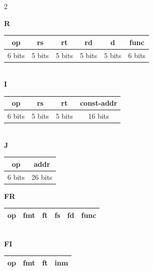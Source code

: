 \documentclass[11pt, a4paper]{article}
\begin{document}
\begin{multicols*}{2}
        \begin{tcolorbox}[
        colback=white, %
        colframe=blue!40!black, %
        title= {\centering \textbf{Formatos Básico de Instrucciones} },
        fonttitle=\bfseries,
        size=small
        ]
            \textbf{R}
            \begin{tabular}{|c|c|c|c|c|c|}
                \hline
                op & rs & rt & rd & d & func \\
                \hline
                \multicolumn{1}{c}{\tiny 6 bits} &
                \multicolumn{1}{c}{\tiny 5 bits} &
                \multicolumn{1}{c}{\tiny 5 bits} &
                \multicolumn{1}{c}{\tiny 5 bits} &
                \multicolumn{1}{c}{\tiny 5 bits} &
                \multicolumn{1}{c}{\tiny 6 bits} \\
            \end{tabular} \\
            \textbf{I}
            \begin{tabular}{|c|c|c|c|}
                \hline
                op & rs & rt & const-addr \\
                \hline
                 \multicolumn{1}{c}{\tiny 6 bits} &
                \multicolumn{1}{c}{\tiny 5 bits} &
                \multicolumn{1}{c}{\tiny 5 bits} &
                \multicolumn{1}{c}{\tiny 16 bits} \\
            \end{tabular} \\
            \textbf{J}
            \begin{tabular}{|c|c|}
                \hline
                op & addr  \\
                \hline
                \multicolumn{1}{c}{\tiny 6 bits} &
                \multicolumn{1}{c}{\tiny 26 bits} \\
            \end{tabular}
        \end{tcolorbox}

        \begin{tcolorbox}[
        colback=white, %
        colframe=blue!40!black, %
        title= {\centering \textbf{Formatos de Instrucción Punto Flotante} },
        fonttitle=\bfseries,
        size=small
        ]
            \textbf{FR}
            \begin{tabular}{|c|c|c|c|c|c|}
                \hline
                op & fmt & ft & fs & fd & func \\
                \hline
            \end{tabular} \\
            \textbf{FI}
            \begin{tabular}{|c|c|c|c|}
                \hline
                op & fmt & ft & inm \\
                \hline
            \end{tabular} \\
        \end{tcolorbox}


\end{multicols*}
\end{document}

